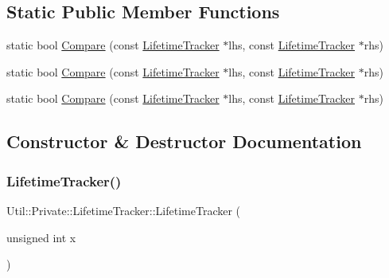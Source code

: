 \subsection*{Static Public Member Functions}
\begin{DoxyCompactItemize}
\item 
static bool \mbox{\hyperlink{classUtil_1_1Private_1_1LifetimeTracker_aa24d4865c53c4f962183ce31276efd7c}{Compare}} (const \mbox{\hyperlink{classUtil_1_1Private_1_1LifetimeTracker}{Lifetime\+Tracker}} $\ast$lhs, const \mbox{\hyperlink{classUtil_1_1Private_1_1LifetimeTracker}{Lifetime\+Tracker}} $\ast$rhs)
\item 
static bool \mbox{\hyperlink{classUtil_1_1Private_1_1LifetimeTracker_aa24d4865c53c4f962183ce31276efd7c}{Compare}} (const \mbox{\hyperlink{classUtil_1_1Private_1_1LifetimeTracker}{Lifetime\+Tracker}} $\ast$lhs, const \mbox{\hyperlink{classUtil_1_1Private_1_1LifetimeTracker}{Lifetime\+Tracker}} $\ast$rhs)
\item 
static bool \mbox{\hyperlink{classUtil_1_1Private_1_1LifetimeTracker_aa24d4865c53c4f962183ce31276efd7c}{Compare}} (const \mbox{\hyperlink{classUtil_1_1Private_1_1LifetimeTracker}{Lifetime\+Tracker}} $\ast$lhs, const \mbox{\hyperlink{classUtil_1_1Private_1_1LifetimeTracker}{Lifetime\+Tracker}} $\ast$rhs)
\end{DoxyCompactItemize}


\subsection{Constructor \& Destructor Documentation}
\mbox{\label{classUtil_1_1Private_1_1LifetimeTracker_adfc292ac14a2b71f88059accf8925772}} 
\subsubsection{\texorpdfstring{LifetimeTracker()}{LifetimeTracker()}\hspace{0.1cm}{\footnotesize\ttfamily [1/3]}}
{\footnotesize\ttfamily Util\+::\+Private\+::\+Lifetime\+Tracker\+::\+Lifetime\+Tracker (\begin{DoxyParamCaption}\item[{unsigned int}]{x }\end{DoxyParamCaption})\hspace{0.3cm}{\ttfamily [inline]}}

